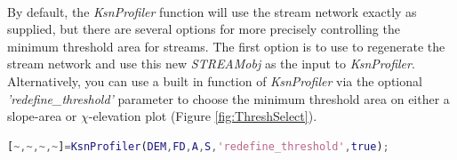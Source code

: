 \paragraph{}By default, the \textit{KsnProfiler} function will use the stream network exactly as supplied, but there are several options for more precisely controlling the minimum threshold area for streams. The first option is to use  to regenerate the stream network and use this new \textit{STREAMobj} as the input to \textit{KsnProfiler}. Alternatively, you can use a built in function of \textit{KsnProfiler} via the optional \textit{'redefine\_threshold'} parameter to choose the minimum threshold area on either a slope-area or $\chi$-elevation plot (Figure \ref{fig:ThreshSelect}).

 \begin{lstlisting}[language=Matlab]
% To redefine minimum threshold area for each stream chosen stream segment individually:
[~,~,~,~]=KsnProfiler(DEM,FD,A,S,'redefine_threshold',true);
\end{lstlisting}

